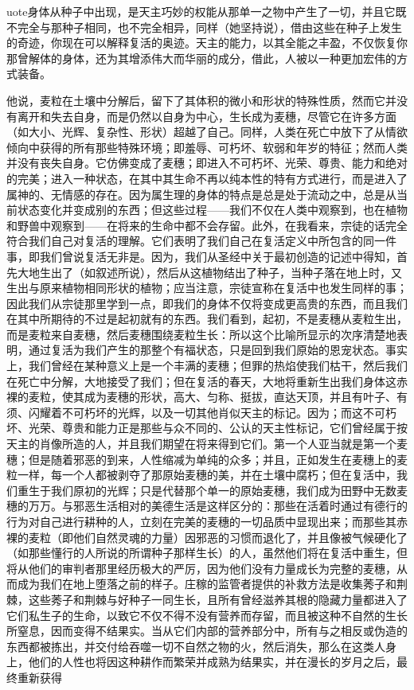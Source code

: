uote{身体}从种子中出现，是天主巧妙的权能从那单一之物中产生了一切，并且它既不完全与那种子相同，也不完全相异，同样（她坚持说），借由这些在种子上发生的奇迹，你现在可以解释复活的奥迹。天主的能力，以其全能之丰盈，不仅恢复你那曾解体的身体，还为其增添伟大而华丽的成分，借此，人被以一种更加宏伟的方式装备。\par

他说，麦粒在土壤中分解后，留下了其体积的微小和形状的特殊性质，然而它并没有离开和失去自身，而是仍然以自身为中心，生长成为麦穗，尽管它在许多方面（如大小、光辉、复杂性、形状）超越了自己。同样，人类在死亡中放下了从情欲倾向中获得的所有那些特殊环境；即羞辱、可朽坏、软弱和年岁的特征；然而人类并没有丧失自身。它仿佛变成了麦穗；即进入不可朽坏、光荣、尊贵、能力和绝对的完美；进入一种状态，在其中其生命不再以纯本性的特有方式进行，而是进入了属神的、无情感的存在。因为属生理的身体的特点是总是处于流动之中，总是从当前状态变化并变成别的东西；但这些过程——我们不仅在人类中观察到，也在植物和野兽中观察到——在将来的生命中都不会存留。此外，在我看来，宗徒的话完全符合我们自己对复活的理解。它们表明了我们自己在复活定义中所包含的同一件事，即我们曾说复活无非是。因为，我们从圣经中关于最初创造的记述中得知，首先大地生出了（如叙述所说），然后从这植物结出了种子，当种子落在地上时，又生出与原来植物相同形状的植物；应当注意，宗徒宣称在复活中也发生同样的事；因此我们从宗徒那里学到一点，即我们的身体不仅将变成更高贵的东西，而且我们在其中所期待的不过是起初就有的东西。我们看到，起初，不是麦穗从麦粒生出，而是麦粒来自麦穗，然后麦穗围绕麦粒生长：所以这个比喻所显示的次序清楚地表明，通过复活为我们产生的那整个有福状态，只是回到我们原始的恩宠状态。事实上，我们曾经在某种意义上是一个丰满的麦穗；但罪的热焰使我们枯干，然后我们在死亡中分解，大地接受了我们；但在复活的春天，大地将重新生出我们身体这赤裸的麦粒，使其成为麦穗的形状，高大、匀称、挺拔，直达天顶，并且有叶子、有须、闪耀着不可朽坏的光辉，以及一切其他肖似天主的标记。因为；而这不可朽坏、光荣、尊贵和能力正是那些与众不同的、公认的天主性标记，它们曾经属于按天主的肖像所造的人，并且我们期望在将来得到它们。第一个人亚当就是第一个麦穗；但是随着邪恶的到来，人性缩减为单纯的众多；并且，正如发生在麦穗上的麦粒一样，每一个人都被剥夺了那原始麦穗的美，并在土壤中腐朽；但在复活中，我们重生于我们原初的光辉；只是代替那个单一的原始麦穗，我们成为田野中无数麦穗的万万。与邪恶生活相对的美德生活是这样区分的：那些在活着时通过有德行的行为对自己进行耕种的人，立刻在完美的麦穗的一切品质中显现出来；而那些其赤裸的麦粒（即他们自然灵魂的力量）因邪恶的习惯而退化了，并且像被气候硬化了（如那些懂行的人所说的所谓种子那样生长）的人，虽然他们将在复活中重生，但将从他们的审判者那里经历极大的严厉，因为他们没有力量成长为完整的麦穗，从而成为我们在地上堕落之前的样子。庄稼的监管者提供的补救方法是收集莠子和荆棘，这些莠子和荆棘与好种子一同生长，且所有曾经滋养其根的隐藏力量都进入了它们私生子的生命，以致它不仅不得不没有营养而存留，而且被这种不自然的生长所窒息，因而变得不结果实。当从它们内部的营养部分中，所有与之相反或伪造的东西都被拣出，并交付给吞噬一切不自然之物的火，然后消失，那么在这类人身上，他们的人性也将因这种耕作而繁荣并成熟为结果实，并在漫长的岁月之后，最终重新获得